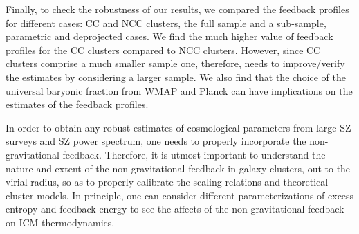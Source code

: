 \documentclass[a4paper,fleqn,usenatbib]{mnras}
\begin{document}
Finally, to check the robustness of our results, we compared the feedback profiles for different cases:  CC and NCC clusters, the full sample and a sub-sample, parametric and deprojected cases. We find the much higher value of feedback profiles for the CC clusters compared to NCC clusters. However, since CC clusters comprise  a much smaller sample one, therefore, needs to improve/verify the estimates by considering a larger sample.  We also find that the choice of the universal baryonic fraction from  WMAP and Planck can have implications on the estimates of the feedback profiles.  

In order to obtain any robust estimates of cosmological parameters from large SZ surveys and SZ power spectrum, one needs to  properly incorporate the non-gravitational feedback. Therefore, it is utmost important to understand the nature and extent of the non-gravitational feedback in galaxy clusters, out to the virial radius, so as to properly calibrate the scaling relations and theoretical cluster models. In principle, one can consider different parameterizations of excess entropy and feedback energy to see the affects of the non-gravitational feedback on ICM thermodynamics. 
\end{document}
